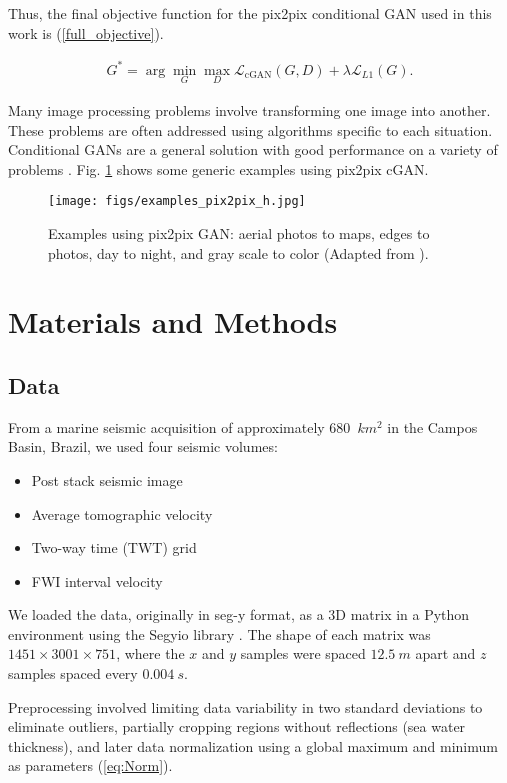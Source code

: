 \documentclass[conference]{IEEEtran}
\begin{document}
Thus, the final objective function for the pix2pix conditional GAN used in this work is (\ref{full_objective}).

\begin{align}
    G^*  = \arg\min_G\max_D \mathcal{L}_{\mathrm{cGAN}}(G,D) + \lambda \mathcal{L}_{L1}(G).\label{full_objective}
\end{align}



Many image processing problems involve transforming one image into another. These problems are often addressed using algorithms specific to each situation. Conditional GANs are a general solution with good performance on a variety of problems \cite{isola2018imagetoimage}. Fig. \ref{fig:example_pix2pix} shows some generic examples using pix2pix cGAN.

\begin{figure}[b]
 \centering
 \texttt{[image: figs/examples\_pix2pix\_h.jpg]}
  \caption{Examples using pix2pix GAN:  aerial photos to maps, edges to photos, day to night, and gray scale to color (Adapted from \cite{isola2018imagetoimage}).}
 \label{fig:example_pix2pix}
\end{figure}

\section{Materials and Methods}

\subsection{Data}
From a marine seismic acquisition of approximately 680~$km^2$  in the Campos Basin, Brazil, we used four seismic volumes:
\begin{itemize}
    \item Post stack seismic image
    \item Average tomographic velocity 
    \item Two-way time (TWT) grid
    \item FWI interval velocity 
\end{itemize}

We loaded the data, originally in seg-y format,  as a 3D matrix in a Python environment using the Segyio library \cite{segyiodocs}. The shape of each matrix was $1451\times3001\times751$, where the $x$ and $y$ samples were spaced $12.5~m$ apart and $z$ samples spaced every $0.004~s$.

Preprocessing involved limiting data variability in two standard deviations to eliminate outliers, partially cropping regions without reflections (sea water thickness), and later data normalization using a global maximum and minimum as parameters (\ref{eq:Norm}).
\end{document}

